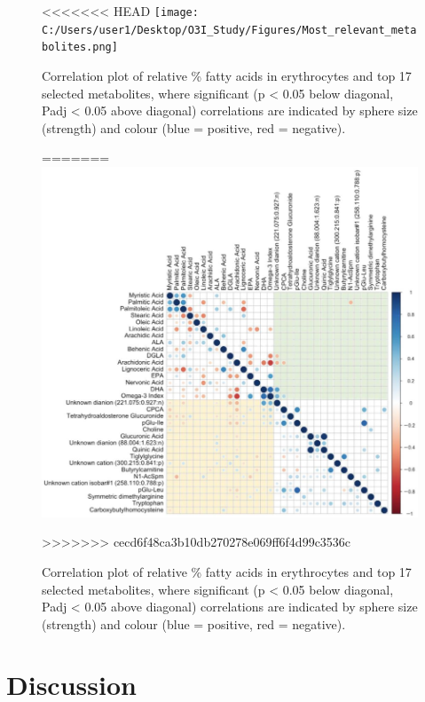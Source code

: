 \documentclass[journal=jacsat,manuscript=article]{achemso}
\begin{document}
\begin{figure}
<<<<<<< HEAD
\centering
\texttt{[image: C:/Users/user1/Desktop/O3I\_Study/Figures/Most\_relevant\_metabolites.png]}
\caption{Correlation plot of relative \% fatty acids in erythrocytes and
top 17 selected metabolites, where significant (p \textless{} 0.05 below
diagonal, Padj \textless{} 0.05 above diagonal) correlations are
indicated by sphere size (strength) and colour (blue = positive, red =
negative). \label{fig4}}\label{fig:fig4}
=======
\includegraphics[width=0.8\linewidth]{../Figures/Most_relevant_metabolites} \caption{Correlation plot of relative \% fatty acids in erythrocytes and top 17 selected metabolites, where significant (p < 0.05 below diagonal, Padj < 0.05 above diagonal) correlations are indicated by sphere size (strength) and colour (blue = positive, red = negative).}\label{fig:unnamed-chunk-4}
>>>>>>> cecd6f48ca3b10db270278e069ff6f4d99c3536c
\end{figure}

\section{Discussion}\label{discussion}
\end{document}
